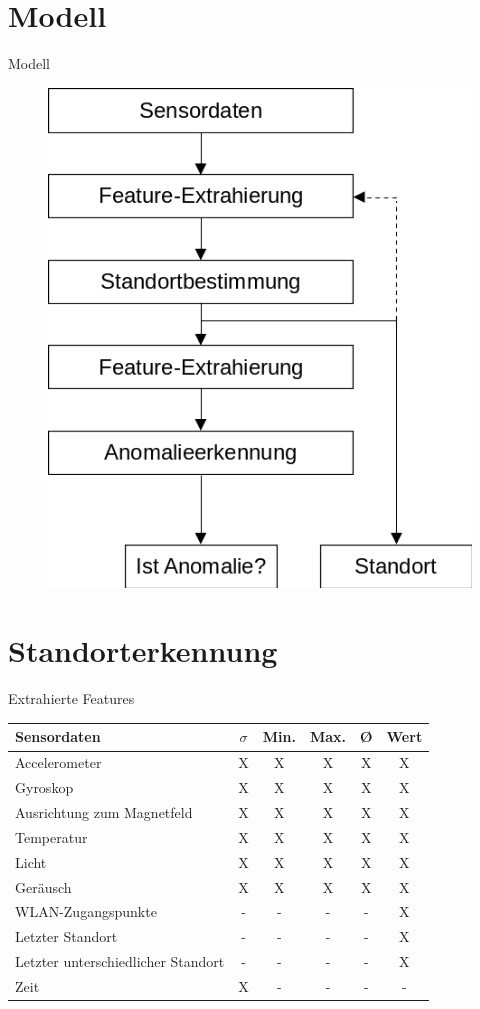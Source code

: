 \documentclass[10pt]{beamer}
\begin{document}
\section{Modell}
\begin{frame}{Modell}
    \begin{figure}
        \centering
        \includegraphics[width=0.55\linewidth]{model/model_vertical.png}
    \end{figure}
\end{frame}

\section{Standorterkennung}
\begin{frame}{Extrahierte Features}
    \begin{table}
        \centering
        \begin{tabular}{ | l | c | c | c | c | c | }
            \hline
            Sensordaten & $\sigma$ & Min. & Max. & Ø & Wert \\\hline
            Accelerometer & X & X & X & X & X \\\hline
            Gyroskop & X & X & X & X & X \\\hline
            Ausrichtung zum Magnetfeld & X & X & X & X & X \\\hline
            Temperatur & X & X & X & X & X \\\hline
            Licht & X & X & X & X & X \\\hline
            Geräusch & X & X & X & X & X \\\hline
            WLAN-Zugangspunkte & - & - & - & - & X \\\hline
            Letzter Standort & - & - & - & - & X \\\hline
            Letzter unterschiedlicher Standort & - & - & - & - & X \\\hline
            Zeit & X & - & - & - & - \\\hline
        \end{tabular}
    \end{table}
\end{frame}
\end{document}
